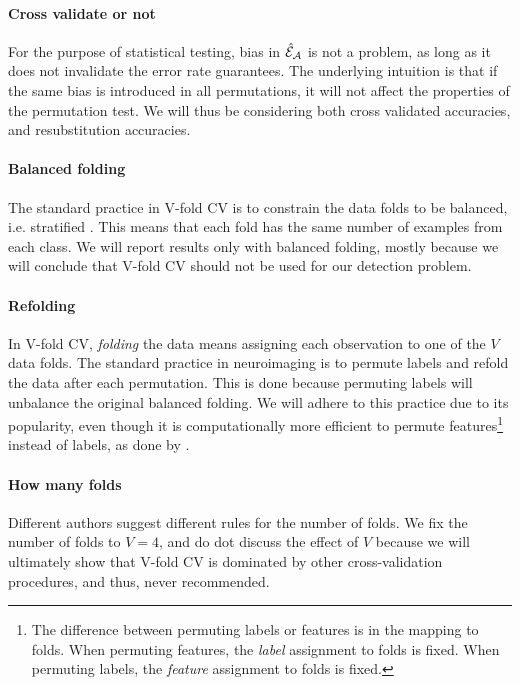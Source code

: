 \documentclass[journal]{IEEEtran}
\begin{document}
\paragraph{Cross validate or not}
For the purpose of statistical testing, bias in $\hat{\mathcal{E}}_{\mathcal{A}}$ is not a problem, as long as it does not invalidate the error rate guarantees. 
The underlying intuition is that if the same bias is introduced in all permutations, it will not affect the properties of the permutation test. 
We will thus be considering both cross validated accuracies, and resubstitution accuracies.


\paragraph{Balanced folding}
The standard practice in V-fold CV is to constrain the data folds to be balanced, i.e. stratified \cite[for e.g.]{ojala_permutation_2010}.
This means that each fold has the same number of examples from each class. 
We will report results only with balanced folding, mostly because we will conclude that V-fold CV should not be used for our detection problem. 


\paragraph{Refolding}
In V-fold CV, \emph{folding} the data means assigning each observation to one of the $V$ data folds. 
The standard practice in neuroimaging is to permute labels and refold the data after each permutation. 
This is done because permuting labels will unbalance the original balanced folding.
We will adhere to this practice due to its popularity, even though it is computationally more efficient to permute features\footnote{The difference between permuting labels or features is in the mapping to folds. When permuting features, the \textit{label} assignment to folds is fixed. When permuting labels, the \textit{feature} assignment to folds is fixed.} instead of labels, as done by \cite{golland_permutation_2005}.


\paragraph{How many folds}
Different authors suggest different rules for the number of folds. 
We fix the number of folds to $V=4$, and do dot discuss the effect of $V$ because we will ultimately show that V-fold CV is dominated by other cross-validation procedures, and thus, never recommended. 
\end{document}
